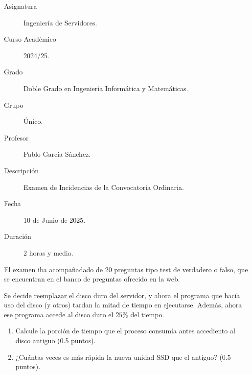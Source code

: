 \documentclass[12pt]{article}
\begin{document}

    
    

    \begin{description}
        \item[Asignatura] Ingeniería de Servidores.
        \item[Curso Académico] 2024/25.
        \item[Grado] Doble Grado en Ingeniería Informática y Matemáticas.
        \item[Grupo] Único.
        \item[Profesor] Pablo García Sánchez.
        \item[Descripción] Examen de Incidencias de la Convocatoria Ordinaria.
        \item[Fecha] 10 de Junio de 2025.
        \item[Duración] 2 horas y media.
    
    \end{description}
    \newpage


    
    El examen iba acompañadado de 20 preguntas tipo test de verdadero o falso, que se encuentran en el banco de preguntas ofrecido en la web.


    \begin{ejercicio}[1 punto]
        Se decide reemplazar el disco duro del servidor, y ahora el programa que hacía uso del disco (y otros) tardan la mitad de tiempo en ejecutarse. Además, ahora ese programa accede al disco duro el $25\%$ del tiempo.
        \begin{enumerate}
            \item Calcule la porción de tiempo que el proceso consumía antes accediento al disco antiguo (0.5 puntos).
            \item ¿Cuántas veces es más rápida la nueva unidad SSD que el antiguo? (0.5 puntos).
        \end{enumerate}
    \end{ejercicio}
\end{document}
